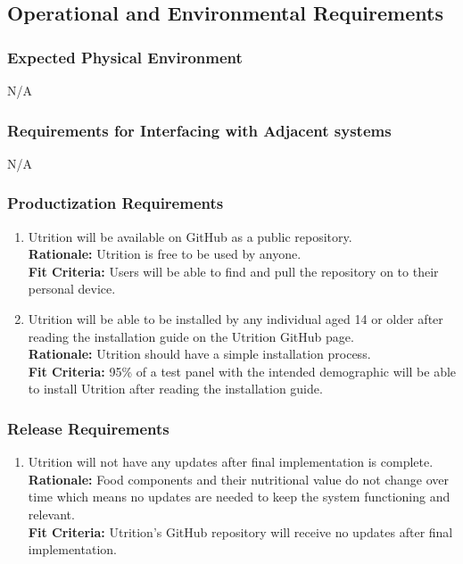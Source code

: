 \documentclass[12pt]{article}
\begin{document}
\subsection{Operational and Environmental Requirements}

\subsubsection{Expected Physical Environment}
\hspace{1.5cm}N/A

\subsubsection{Requirements for Interfacing with Adjacent systems}
\hspace{1.5cm}N/A 

\subsubsection{Productization Requirements}
\begin{enumerate}[start=1,label={OE\arabic*.}]
	\item Utrition will be available on GitHub as a public repository.\\
	\textbf{Rationale:} Utrition is free to be used by anyone.\\
	\textbf{Fit Criteria:} Users will be able to find and pull the repository on to their personal device.
	\item Utrition will be able to be installed by any individual aged 14 or older after reading the installation guide on the Utrition GitHub page.\\
	\textbf{Rationale:} Utrition should have a simple installation process. \\
	\textbf{Fit Criteria:} 95\% of a test panel with the intended demographic will be able to install Utrition after reading the installation guide.
\end{enumerate}

\subsubsection{Release Requirements}

\begin{enumerate}[{OE}3. ] 
	\item Utrition will not have any updates after final implementation is complete.\\
	\textbf{Rationale:} Food components and their nutritional value do not change over time which means no updates are needed to keep the system functioning and relevant.\\	
	\textbf{Fit Criteria:} Utrition’s GitHub repository will receive no updates after final implementation.
\end{enumerate}
\end{document}
